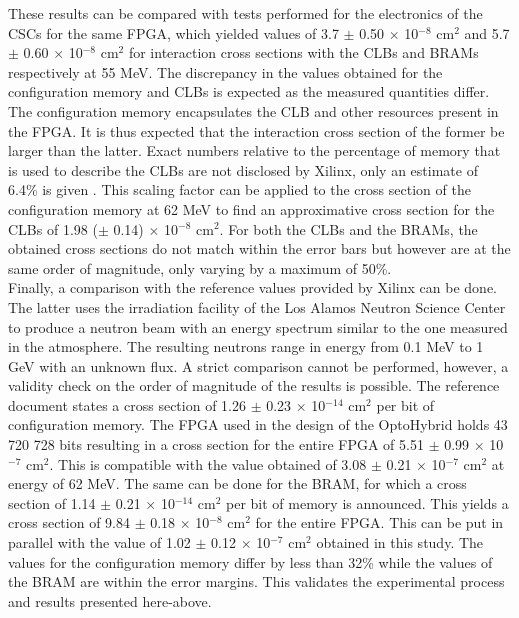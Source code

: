       These results can be compared with tests performed for the electronics of the CSCs \cite{Bylsma2013242} for the same FPGA, which yielded values of 3.7 $\pm$ 0.50 $ \times $ 10$^{-8}$ cm$^2$ and 5.7 $\pm$ 0.60 $ \times $ 10$^{-8}$ cm$^2$ for interaction cross sections with the CLBs and BRAMs respectively at 55 MeV. The discrepancy in the values obtained for the configuration memory and CLBs is expected as the measured quantities differ. The configuration memory encapsulates the CLB and other resources present in the FPGA. It is thus expected that the interaction cross section of the former be larger than the latter. Exact numbers relative to the percentage of memory that is used to describe the CLBs are not disclosed by Xilinx, only an estimate of 6.4\% is given \cite{XILINX-SEM}. This scaling factor can be applied to the cross section of the configuration memory at 62 MeV to find an approximative cross section for the CLBs of 1.98 ($\pm$ 0.14) $\times$ 10$^{-8}$ cm$^2$. For both the CLBs and the BRAMs, the obtained cross sections do not match within the error bars but however are at the same order of magnitude, only varying by a maximum of 50\%. \\

      Finally, a comparison with the reference values provided by Xilinx \cite{XILINX-RELAIBILITY} can be done. The latter uses the irradiation facility of the Los Alamos Neutron Science Center to produce a neutron beam with an energy spectrum similar to the one measured in the atmosphere. The resulting neutrons range in energy from 0.1 MeV to 1 GeV with an unknown flux. A strict comparison cannot be performed, however, a validity check on the order of magnitude of the results is possible. The reference document states a cross section of 1.26 $\pm$ 0.23 $\times$ 10$^{-14}$ cm$^2$ per bit of configuration memory. The FPGA used in the design of the OptoHybrid holds 43 720 728 bits resulting in a cross section for the entire FPGA of 5.51 $\pm$ 0.99 $\times$ 10$^{-7}$ cm$^2$. This is compatible with the value obtained of 3.08 $\pm$ 0.21 $ \times $ 10$^{-7}$ cm$^2$ at energy of 62 MeV. The same can be done for the BRAM, for which a cross section of 1.14 $\pm$ 0.21 $ \times $ 10$^{-14}$ cm$^2$ per bit of memory is announced. This yields a cross section of 9.84 $\pm$ 0.18 $\times$ 10$^{-8}$ cm$^2$ for the entire FPGA. This can be put in parallel with the value of 1.02 $\pm$ 0.12 $ \times $ 10$^{-7}$ cm$^2$ obtained in this study. The values for the configuration memory differ by less than 32\% while the values of the BRAM are within the error margins. This validates the experimental process and results presented here-above.

